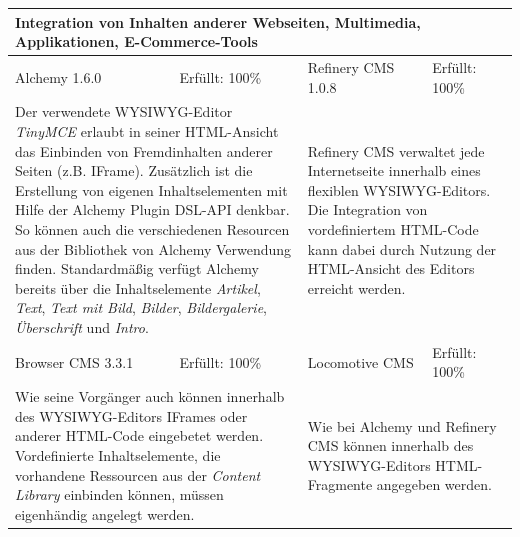 \begin{tabular}[!ht]{|l|l|l|l|}
\hline
\multicolumn{4}{|p{15cm}|}{\textbf{Integration von Inhalten anderer Webseiten, Multimedia, Applikationen, E-Commerce-Tools}} \\
\hline
  Alchemy 1.6.0 & \cellcolor{green}Erfüllt: 100\% & Refinery CMS 1.0.8 & \cellcolor{green}Erfüllt: 100\% \\
  \hline
  \multicolumn{2}{|p{7.5cm}|}{Der verwendete WYSIWYG-Editor \emph{TinyMCE} erlaubt in seiner HTML-Ansicht das Einbinden von Fremdinhalten anderer Seiten (z.B. IFrame). Zusätzlich ist die Erstellung von eigenen Inhaltselementen mit Hilfe der Alchemy Plugin DSL-API denkbar. So können auch die verschiedenen Resourcen aus der Bibliothek von Alchemy Verwendung finden. Standardmäßig verfügt Alchemy bereits über die Inhaltselemente \emph{Artikel}, \emph{Text}, \emph{Text mit Bild}, \emph{Bilder}, \emph{Bildergalerie}, \emph{Überschrift} und \emph{Intro}.}
   & \multicolumn{2}{p{7.5cm}|}{Refinery CMS verwaltet jede Internetseite innerhalb eines flexiblen WYSIWYG-Editors. Die Integration von vordefiniertem HTML-Code kann dabei durch Nutzung der HTML-Ansicht des Editors erreicht werden.
} \\
  \hline
  Browser CMS 3.3.1 & \cellcolor{green}Erfüllt: 100\% & Locomotive CMS & \cellcolor{green}Erfüllt: 100\% \\
  \hline
  \multicolumn{2}{|p{7.5cm}|}{Wie seine Vorgänger auch können innerhalb des WYSIWYG-Editors IFrames oder anderer HTML-Code eingebetet werden. Vordefinierte Inhaltselemente, die vorhandene Ressourcen aus der \emph{Content Library} einbinden können, müssen eigenhändig angelegt werden.} & \multicolumn{2}{p{7.5cm}|}{Wie bei Alchemy und Refinery CMS können innerhalb des  WYSIWYG-Editors HTML-Fragmente angegeben werden.} \\
\hline
\end{tabular}
